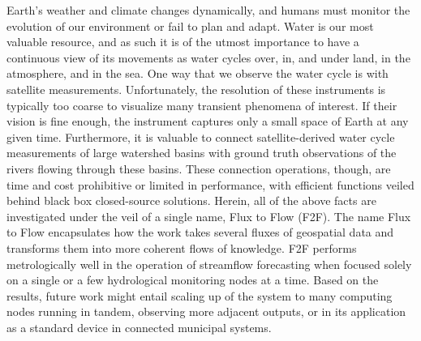 \startabstract

Earth’s weather and climate changes dynamically, and humans must monitor the evolution of our environment or fail to plan and adapt. Water is our most valuable resource, and as such it is of the utmost importance to have a continuous view of its movements as water cycles over, in, and under land, in the atmosphere, and in the sea. One way that we observe the water cycle is with satellite measurements. Unfortunately, the resolution of these instruments is typically too coarse to visualize many transient phenomena of interest. If their vision is fine enough, the instrument captures only a small space of Earth at any given time. Furthermore, it is valuable to connect satellite-derived water cycle measurements of large watershed basins with ground truth observations of the rivers flowing through these basins. These connection operations, though, are time and cost prohibitive or limited in performance, with efficient functions veiled behind black box closed-source solutions. Herein, all of the above facts are investigated under the veil of a single name, Flux to Flow (F2F). The name Flux to Flow encapsulates how the work takes several fluxes of geospatial data and transforms them into more coherent flows of knowledge. F2F performs metrologically well in the operation of streamflow forecasting when focused solely on a single or a few hydrological monitoring nodes at a time. Based on the results, future work might entail scaling up of the system to many computing nodes running in tandem, observing more adjacent outputs, or in its application as a standard device in connected municipal systems.



